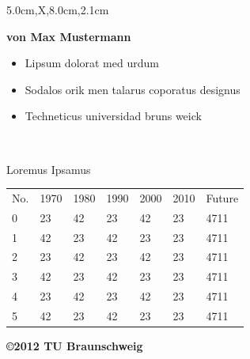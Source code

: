 \documentclass[a2paper,style=scifi,table,parskip=full]{tubsposter}
\begin{document}
  \begin{tubsposter}[bgcolor=tubsGreenLight]{5.0cm,X,8.0cm,2.1cm}
  \begin{posterrow}[bgcolor=tubsViolet,fgcolor=tubsWhite]
    \vfill
    \textbf{\large von Max Mustermann}
  \end{posterrow}
  \begin{posterrow}[X,X]
    \begin{postercol}
      \mdseries{}
      \lipsum[1]\par\lipsum[2]
      \begin{itemize}
        \item Lipsum dolorat med urdum
        \item Sodalos orik men talarus coporatus designus
        \item Techneticus universidad bruns weick
      \end{itemize}
    \end{postercol}
    \begin{postercol}[X,X]
      \begin{postersubrow}[bgimage=infozentrum,imagefit=autoclip]
        ~
      \end{postersubrow}
      \begin{postersubrow}[c,bgcolor=tubsGray20,fgcolor=tubsRed]
        \centering\itshape
        \lipsum[4]\par
        \raggedleft\upshape
        Loremus Ipsamus
      \end{postersubrow}
    \end{postercol}
  \end{posterrow}
  \begin{posterrow*}
    \large
    \begin{tabularx}{\textwidth}{lXXXXXX}
      \rowcolor{tuGray20}
      No. & 1970 & 1980 & 1990 & 2000 & 2010 & Future \\
      0   & 23   & 42   & 23   & 42   & 23   & 4711 \\
      1   & 42   & 23   & 42   & 23   & 23   & 4711 \\
      2   & 23   & 42   & 23   & 42   & 23   & 4711 \\
      3   & 42   & 23   & 42   & 23   & 23   & 4711 \\
      4   & 23   & 42   & 23   & 42   & 23   & 4711 \\
      5   & 42   & 23   & 42   & 23   & 23   & 4711 \\
    \end{tabularx}
  \end{posterrow*}
  \begin{modrow}[bgcolor=tubsViolet]
    \bfseries\raggedleft\textcolor{tubsWhite}{\copyright 2012 TU Braunschweig}
  \end{modrow}
  \end{tubsposter}
\end{document}
